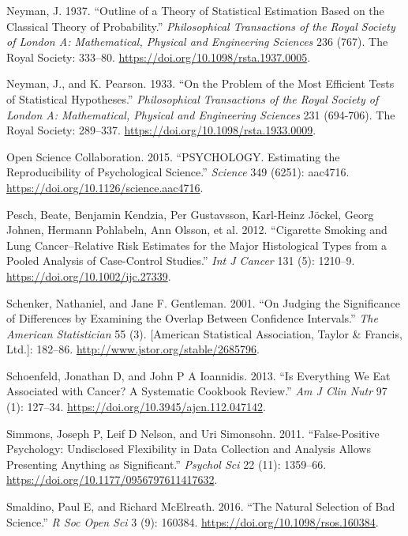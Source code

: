\documentclass[12pt,]{book}
\theoremstyle{definition}
\theoremstyle{definition}
\theoremstyle{definition}
\theoremstyle{remark}
\begin{document}
\leavevmode\hypertarget{ref-Neyman37}{}%
Neyman, J. 1937. ``Outline of a Theory of Statistical Estimation Based on the Classical Theory of Probability.'' \emph{Philosophical Transactions of the Royal Society of London A: Mathematical, Physical and Engineering Sciences} 236 (767). The Royal Society: 333--80. \url{https://doi.org/10.1098/rsta.1937.0005}.

\leavevmode\hypertarget{ref-Neyman289}{}%
Neyman, J., and K. Pearson. 1933. ``On the Problem of the Most Efficient Tests of Statistical Hypotheses.'' \emph{Philosophical Transactions of the Royal Society of London A: Mathematical, Physical and Engineering Sciences} 231 (694-706). The Royal Society: 289--337. \url{https://doi.org/10.1098/rsta.1933.0009}.

\leavevmode\hypertarget{ref-open:2015}{}%
Open Science Collaboration. 2015. ``PSYCHOLOGY. Estimating the Reproducibility of Psychological Science.'' \emph{Science} 349 (6251): aac4716. \url{https://doi.org/10.1126/science.aac4716}.

\leavevmode\hypertarget{ref-pesc:kend:gust:2012}{}%
Pesch, Beate, Benjamin Kendzia, Per Gustavsson, Karl-Heinz Jöckel, Georg Johnen, Hermann Pohlabeln, Ann Olsson, et al. 2012. ``Cigarette Smoking and Lung Cancer--Relative Risk Estimates for the Major Histological Types from a Pooled Analysis of Case-Control Studies.'' \emph{Int J Cancer} 131 (5): 1210--9. \url{https://doi.org/10.1002/ijc.27339}.

\leavevmode\hypertarget{ref-sche:gent:2001}{}%
Schenker, Nathaniel, and Jane F. Gentleman. 2001. ``On Judging the Significance of Differences by Examining the Overlap Between Confidence Intervals.'' \emph{The American Statistician} 55 (3). {[}American Statistical Association, Taylor \& Francis, Ltd.{]}: 182--86. \url{http://www.jstor.org/stable/2685796}.

\leavevmode\hypertarget{ref-scho:ioan:2013}{}%
Schoenfeld, Jonathan D, and John P A Ioannidis. 2013. ``Is Everything We Eat Associated with Cancer? A Systematic Cookbook Review.'' \emph{Am J Clin Nutr} 97 (1): 127--34. \url{https://doi.org/10.3945/ajcn.112.047142}.

\leavevmode\hypertarget{ref-simm:nels:simo:2011}{}%
Simmons, Joseph P, Leif D Nelson, and Uri Simonsohn. 2011. ``False-Positive Psychology: Undisclosed Flexibility in Data Collection and Analysis Allows Presenting Anything as Significant.'' \emph{Psychol Sci} 22 (11): 1359--66. \url{https://doi.org/10.1177/0956797611417632}.

\leavevmode\hypertarget{ref-smal:mcel:2016}{}%
Smaldino, Paul E, and Richard McElreath. 2016. ``The Natural Selection of Bad Science.'' \emph{R Soc Open Sci} 3 (9): 160384. \url{https://doi.org/10.1098/rsos.160384}.
\end{document}
